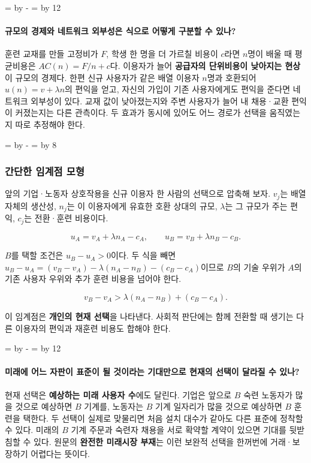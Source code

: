 \documentclass[10pt,a4paper]{article}
\newcommand{\ReserveQuestionSpace}{%
  \par\begingroup
  \dimen0=\pagegoal \advance\dimen0 by -\pagetotal
  \dimen2=\baselineskip \multiply\dimen2 by 12
  \ifdim\dimen0<\dimen2 \newpage\fi
  \endgroup}
\newcommand{\ReserveReadingSectionSpace}{%
  \par\begingroup
  \dimen0=\pagegoal \advance\dimen0 by -\pagetotal
  \dimen2=\baselineskip \multiply\dimen2 by 8
  \ifdim\dimen0<\dimen2 \newpage\fi
  \endgroup}
\begin{document}
\ReserveQuestionSpace
\paragraph{규모의 경제와 네트워크 외부성은 식으로 어떻게 구분할 수 있나?}
훈련 교재를 만들 고정비가 $F$, 학생 한 명을 더 가르칠 비용이 $c$라면 $n$명이 배울 때 평균비용은 $AC(n)=F/n+c$다. 이용자가 늘어 \textbf{공급자의 단위비용이 낮아지는 현상}이 규모의 경제다. 한편 신규 사용자가 같은 배열 이용자 $n$명과 호환되어 $u(n)=v+\lambda n$의 편익을 얻고, 자신의 가입이 기존 사용자에게도 편익을 준다면 네트워크 외부성이 있다. 교재 값이 낮아졌는지와 주변 사용자가 늘어 내 채용·교환 편익이 커졌는지는 다른 관측이다. 두 효과가 동시에 있어도 어느 경로가 선택을 움직였는지 따로 추정해야 한다.\par

\ReserveReadingSectionSpace
\subsubsection*{간단한 임계점 모형}

앞의 기업·노동자 상호작용을 신규 이용자 한 사람의 선택으로 압축해 보자. $v_j$는 배열 자체의 생산성, $n_j$는 이 이용자에게 유효한 호환 상대의 규모, $\lambda$는 그 규모가 주는 편익, $c_j$는 전환·훈련 비용이다.\par

\[
u_A=v_A+\lambda n_A-c_A,\qquad
u_B=v_B+\lambda n_B-c_B.
\]

$B$를 택할 조건은 $u_B-u_A>0$이다. 두 식을 빼면 $u_B-u_A=(v_B-v_A)-\lambda(n_A-n_B)-(c_B-c_A)$이므로 $B$의 기술 우위가 $A$의 기존 사용자 우위와 추가 훈련 비용을 넘어야 한다.\par

\[
v_B-v_A>\lambda(n_A-n_B)+(c_B-c_A).
\]

이 임계점은 \textbf{개인의 현재 선택}을 나타낸다. 사회적 판단에는 함께 전환할 때 생기는 다른 이용자의 편익과 재훈련 비용도 합해야 한다.\par

\ReserveQuestionSpace
\paragraph{미래에 어느 자판이 표준이 될 것이라는 기대만으로 현재의 선택이 달라질 수 있나?}
현재 선택은 \textbf{예상하는 미래 사용자 수}에도 달린다. 기업은 앞으로 $B$ 숙련 노동자가 많을 것으로 예상하면 $B$ 기계를, 노동자는 $B$ 기계 일자리가 많을 것으로 예상하면 $B$ 훈련을 택한다. 두 선택이 실제로 맞물리면 처음 설치 대수가 같아도 다른 표준에 정착할 수 있다. 미래의 $B$ 기계 주문과 숙련자 채용을 서로 확약할 계약이 있으면 기대를 뒷받침할 수 있다. 원문의 \textbf{완전한 미래시장 부재}는 이런 보완적 선택을 한꺼번에 거래·보장하기 어렵다는 뜻이다.\par
\end{document}

